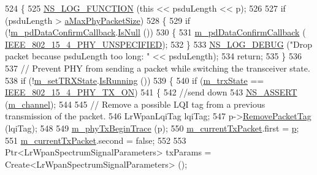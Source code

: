 \begin{DoxyCode}
524 \{
525   \hyperlink{log-macros-disabled_8h_a90b90d5bad1f39cb1b64923ea94c0761}{NS\_LOG\_FUNCTION} (\textcolor{keyword}{this} << psduLength << p);
526 
527   \textcolor{keywordflow}{if} (psduLength > \hyperlink{classns3_1_1LrWpanPhy_a0dac53931aac7c959546ca54db5e39bb}{aMaxPhyPacketSize})
528     \{
529       \textcolor{keywordflow}{if} (!\hyperlink{classns3_1_1LrWpanPhy_a6f736d7cb72829ef100315c1b8f6ea05}{m\_pdDataConfirmCallback}.\hyperlink{classns3_1_1Callback_aa8e27826badbf37f84763f36f70d9b54}{IsNull} ())
530         \{
531           \hyperlink{classns3_1_1LrWpanPhy_a6f736d7cb72829ef100315c1b8f6ea05}{m\_pdDataConfirmCallback} (
      \hyperlink{group__lr-wpan_gga6494269d13d45c511a07b7ccbb1de754a33aedad985a3e4dd7a0c6790a2c677a0}{IEEE\_802\_15\_4\_PHY\_UNSPECIFIED});
532         \}
533       \hyperlink{group__logging_ga413f1886406d49f59a6a0a89b77b4d0a}{NS\_LOG\_DEBUG} (\textcolor{stringliteral}{"Drop packet because psduLength too long: "} << psduLength);
534       \textcolor{keywordflow}{return};
535     \}
536 
537   \textcolor{comment}{// Prevent PHY from sending a packet while switching the transceiver state.}
538   \textcolor{keywordflow}{if} (!\hyperlink{classns3_1_1LrWpanPhy_a0b82e7f96d0225c83489cf3dfb6058ce}{m\_setTRXState}.\hyperlink{classns3_1_1EventId_aabf8476d1a080c199ea0c6aa9ccea372}{IsRunning} ())
539     \{
540       \textcolor{keywordflow}{if} (\hyperlink{classns3_1_1LrWpanPhy_a316704a4eb96e04f4b960ba3577fe0ce}{m\_trxState} == \hyperlink{group__lr-wpan_gga6494269d13d45c511a07b7ccbb1de754aa595d552b56b89b363b800b9fcfbe67f}{IEEE\_802\_15\_4\_PHY\_TX\_ON})
541         \{
542           \textcolor{comment}{//send down}
543           \hyperlink{assert_8h_a6dccdb0de9b252f60088ce281c49d052}{NS\_ASSERT} (\hyperlink{classns3_1_1LrWpanPhy_a6ea4a904afe3b256bc001c40efe496e1}{m\_channel});
544 
545           \textcolor{comment}{// Remove a possible LQI tag from a previous transmission of the packet.}
546           LrWpanLqiTag lqiTag;
547           p->\hyperlink{classns3_1_1Packet_a078fe922d976a417ab25ba2f3c2fd667}{RemovePacketTag} (lqiTag);
548 
549           \hyperlink{classns3_1_1LrWpanPhy_a72273155da1a3b5340389633f5486860}{m\_phyTxBeginTrace} (p);
550           \hyperlink{classns3_1_1LrWpanPhy_a695601152abac951fa1958d826813082}{m\_currentTxPacket}.first = \hyperlink{lte__link__budget_8m_ac9de518908a968428863f829398a4e62}{p};
551           \hyperlink{classns3_1_1LrWpanPhy_a695601152abac951fa1958d826813082}{m\_currentTxPacket}.second = \textcolor{keyword}{false};
552 
553           Ptr<LrWpanSpectrumSignalParameters> txParams = Create<LrWpanSpectrumSignalParameters> ();

\end{DoxyCode}
